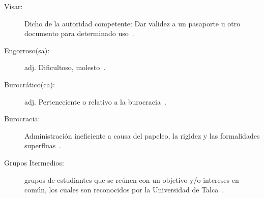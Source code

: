 \begin{glosario}
	\item 	\begin{description}
			    \item[Visar:] Dicho de la autoridad competente: Dar validez a un pasaporte u otro documento para determinado uso~\cite{4}.
			\end{description} 

	\item 	\begin{description}
			    \item[Engorroso(sa):] adj. Dificultoso, molesto~\cite{14}.
			\end{description}
	
	\item 	\begin{description}
			    \item[Burocrático(ca):] adj. Perteneciente o relativo a la burocracia~\cite{15}.
			\end{description}
	
	\item 	\begin{description}
			    \item[Burocracia:] Administración ineficiente a causa del papeleo, la rigidez y las 
				formalidades superfluas~\cite{16}.
			\end{description}

	\item 	\begin{description}
			    \item[Grupos Itermedios:] grupos de estudiantes que se reúnen con un objetivo y/o intereses en común, los cuales son reconocidos por la Universidad de Talca~\cite{18}.
			\end{description}

\end{glosario}
